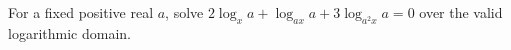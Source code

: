 For a fixed positive real $a$, solve $2\log_xa+\log_{ax}a+3\log_{a^2x}a=0$ over the valid logarithmic domain.

